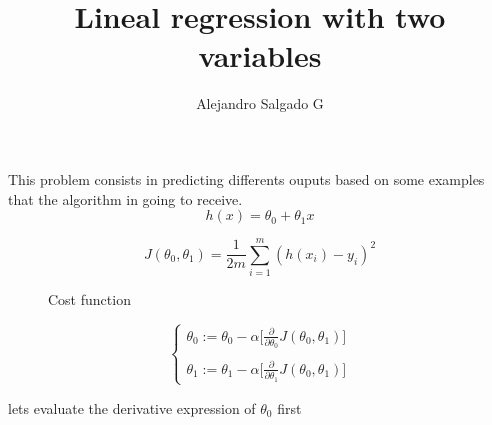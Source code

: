 \documentclass[12pt,journal]{IEEEtran}
\begin{document}
    \title{Lineal regression with two variables}
    \author{Alejandro Salgado G}
    \maketitle

    This problem consists in predicting differents ouputs based on some examples
    that the algorithm in going to receive. \\

    \begin{equation}
        h(x) = \theta_0 + \theta_1 x
    \end{equation}

    \begin{equation}
        J(\theta_0, \theta_1) = \frac{1}{2m} \sum_{i=1}^{m} ( h(x_i)  - y_i )^2
    \end{equation}

    \begin{figure}[h]

        \centering
        \captionsetup{justification=centering}


        \caption{Cost function}
    \end{figure}

    \begin{equation}
        \left\{
            \begin{array}{l}
                \theta_0 := \theta_0 - \alpha \Big[ \frac{\partial}{\partial \theta_0} J(\theta_0, \theta_1) \Big] \\ \\
                \theta_1 := \theta_1 - \alpha \Big[ \frac{\partial}{\partial \theta_1} J(\theta_0, \theta_1) \Big]
            \end{array}
        \right.
    \end{equation}

    lets evaluate the derivative expression of $\theta_0$ first
\end{document}
